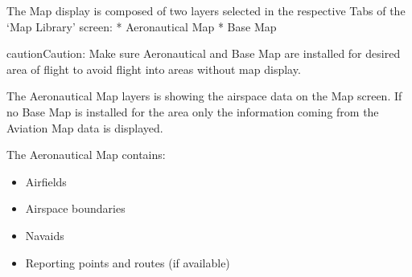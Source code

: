 \documentclass[letterpaper,10pt,english]{sphinxmanual}
\begin{document}
The Map display is composed of two layers selected in the respective Tabs of the ‘Map Library’ screen:
* Aeronautical Map
* Base Map

\begin{sphinxadmonition}{caution}{Caution:}
Make sure Aeronautical and Base Map are installed for desired area of flight to avoid flight into areas without map display.
\end{sphinxadmonition}


The Aeronautical Map layers is showing the airspace data on the Map screen. If no Base Map is installed for the area only the information coming from the Aviation Map data is displayed.

The Aeronautical Map contains:
\begin{itemize}
\item {} 
Airfields

\item {} 
Airspace boundaries

\item {} 
Navaids

\item {} 
Reporting points and routes (if available)

\end{itemize}
\end{document}
